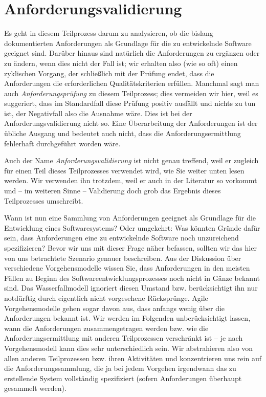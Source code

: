 \section{Anforderungsvalidierung}
\label{sec:Kap-6.4}

Es geht in diesem Teilprozess darum zu analysieren, ob die bislang dokumentierten Anforderungen als Grundlage für die zu entwickelnde Software geeignet sind. \mbox{Darüber} hinaus sind natürlich die Anforderungen zu ergänzen oder zu ändern, wenn dies nicht der Fall ist; wir erhalten also (wie so oft) einen zyklischen Vorgang, der schließlich mit der Prüfung endet, dass die Anforderungen die erforderlichen Qualitäts\-kriterien erfüllen. Manchmal sagt man auch \textit{Anforderungsprüfung} zu diesem Teilprozess; dies vermeiden wir hier, weil es suggeriert, dass im Standardfall diese Prüfung positiv ausfällt und nichts zu tun ist, der Negativfall also die Ausnahme wäre. Dies ist bei der Anforderungsvalidierung nicht so. Eine Überarbeitung der Anforderungen ist der übliche Ausgang und bedeutet auch nicht, dass die Anforderungs\-ermittlung fehlerhaft durchgeführt worden wäre.

Auch der Name \textit{Anforderungsvalidierung} ist nicht genau treffend, weil er zugleich für einen Teil dieses Teilprozesses verwendet wird, wie Sie weiter unten lesen werden. Wir verwenden ihn trotzdem, weil er auch in der Literatur so vorkommt und – im weiteren Sinne – Validierung doch grob das Ergebnis dieses Teilprozesses 
\linebreak %
umschreibt.

Wann ist nun eine Sammlung von Anforderungen geeignet als Grundlage für die Entwicklung eines Softwaresystems? Oder umgekehrt: Was könnten Gründe dafür sein, dass Anforderungen eine zu entwickelnde Software noch unzureichend spezifizieren? Bevor wir uns mit dieser Frage näher befassen, sollten wir das hier von uns betrachtete Szenario genauer beschreiben. Aus der Diskussion über verschiedene Vorgehensmodelle wissen Sie, dass Anforderungen in den meisten Fällen zu Beginn des Softwareentwicklungsprozesses noch nicht in Gänze bekannt sind. Das Wasserfallmodell ignoriert diesen Umstand bzw. berücksichtigt ihn nur notdürftig durch eigentlich nicht vorgesehene Rücksprünge. Agile Vorgehensmodelle gehen sogar davon aus, dass anfangs wenig über die Anforderungen bekannt ist. Wir werden im Folgenden unberücksichtigt lassen, wann die Anforderungen zusammengetragen werden bzw. wie die Anforderungsermittlung mit anderen Teilprozessen verschränkt ist – je nach Vorgehensmodell kann dies sehr unterschiedlich sein. Wir abstrahieren also von allen anderen Teilprozessen bzw. ihren Aktivitäten und konzentrieren uns rein auf die Anforderungssammlung, die ja bei jedem Vorgehen irgendwann das zu erstellende System vollständig spezifiziert (sofern Anforderungen überhaupt gesammelt werden).

